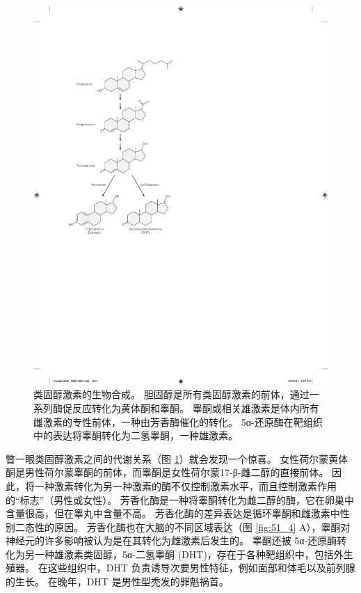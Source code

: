 \begin{figure}[htbp]
	\centering
	\includegraphics[width=0.5\linewidth]{chap51/fig_51_3}
	\caption{类固醇激素的生物合成。 胆固醇是所有类固醇激素的前体，通过一系列酶促反应转化为黄体酮和睾酮。 睾酮或相关雄激素是体内所有雌激素的专性前体，一种由芳香酶催化的转化。 5α-还原酶在靶组织中的表达将睾酮转化为二氢睾酮，一种雄激素。}
	\label{fig:51_3}
\end{figure}

瞥一眼类固醇激素之间的代谢关系（图 \ref{fig:51_3}）就会发现一个惊喜。 女性荷尔蒙黄体酮是男性荷尔蒙睾酮的前体，而睾酮是女性荷尔蒙17-β-雌二醇的直接前体。 因此，将一种激素转化为另一种激素的酶不仅控制激素水平，而且控制激素作用的“标志”（男性或女性）。 芳香化酶是一种将睾酮转化为雌二醇的酶，它在卵巢中含量很高，但在睾丸中含量不高。 芳香化酶的差异表达是循环睾酮和雌激素中性别二态性的原因。 芳香化酶也在大脑的不同区域表达（图 \ref{fig:51_4} A），睾酮对神经元的许多影响被认为是在其转化为雌激素后发生的。 睾酮还被 5α-还原酶转化为另一种雄激素类固醇，5α-二氢睾酮 (DHT)，存在于各种靶组织中，包括外生殖器。 在这些组织中，DHT 负责诱导次要男性特征，例如面部和体毛以及前列腺的生长。 在晚年，DHT 是男性型秃发的罪魁祸首。


